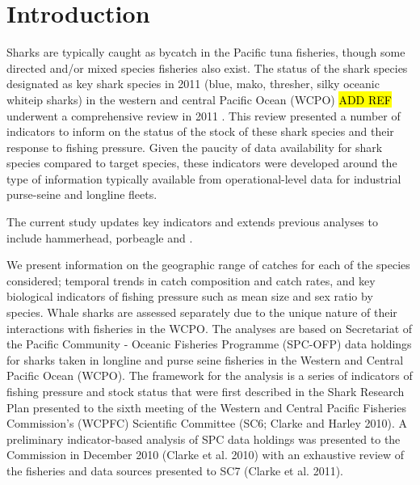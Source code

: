 \documentclass[12pt]{SCreport}
\begin{document}
\wcpfctitlepage

\tableofcontents


\section{Introduction} %



Sharks are typically caught as bycatch in the Pacific tuna fisheries, though some directed and/or mixed species fisheries also exist. The status of the shark species designated as key shark species in 2011 (blue, mako, thresher, silky oceanic whiteip  sharks) in the western and central Pacific Ocean (WCPO) \hl{ADD REF} underwent a comprehensive review in 2011 \citep{Clarke2011_a}. This review presented a number of indicators to inform on the status of the stock of these shark species and their response to fishing pressure. Given the paucity of data availability for shark species compared to target species, these indicators were developed around the type of information typically available from operational-level data for industrial purse-seine and longline fleets. 

The current study updates key indicators and extends previous analyses to include hammerhead, porbeagle and .  

We present information on the geographic range of catches for each of the species considered; temporal trends in catch composition and catch rates, and key biological indicators of fishing pressure such as mean size and sex ratio by species. Whale sharks are assessed separately due to the unique nature of their interactions with fisheries in the WCPO. The analyses are based on Secretariat of the Pacific Community - Oceanic Fisheries Programme (SPC-OFP) data holdings for sharks taken in longline and purse seine fisheries in the Western and Central Pacific Ocean (WCPO). The framework for the analysis is a series of indicators of fishing pressure and stock status that were first described in the Shark Research Plan presented to the sixth meeting of the Western and Central Pacific Fisheries Commission's (WCPFC) Scientific Committee (SC6; Clarke and Harley 2010). A preliminary indicator-based analysis of SPC data holdings was presented to the Commission in December 2010 (Clarke et al. 2010) with an exhaustive review of the fisheries and data sources presented to SC7 (Clarke et al. 2011). 
\end{document}
